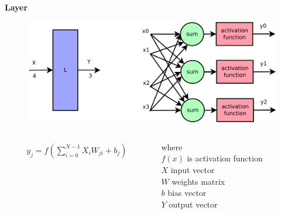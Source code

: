\documentclass[xcolor=dvipsnames]{beamer}
\begin{document}
\begin{frame}{\bf Layer}

\begin{figure}
  \includegraphics[scale=0.2]{../../diagrams/nn/nn_layer.png}
\end{figure}

\begin{columns}
    \begin{column}{0.5\textwidth}

    \begin{align*}
        y_j = f(\sum_{i=0}^{N-1} X_iW_{ji} + b_j) \\
    \end{align*}

    \end{column}

    \begin{column}{0.5\textwidth}  %

    where \\
        $f(x)$ is activation function \\
        $X$ input vector \\
        $W$ weights matrix \\
        $b$ bias vector \\
        $Y$ output vector \\

    \end{column}



\end{columns}



\end{frame}
\end{document}
